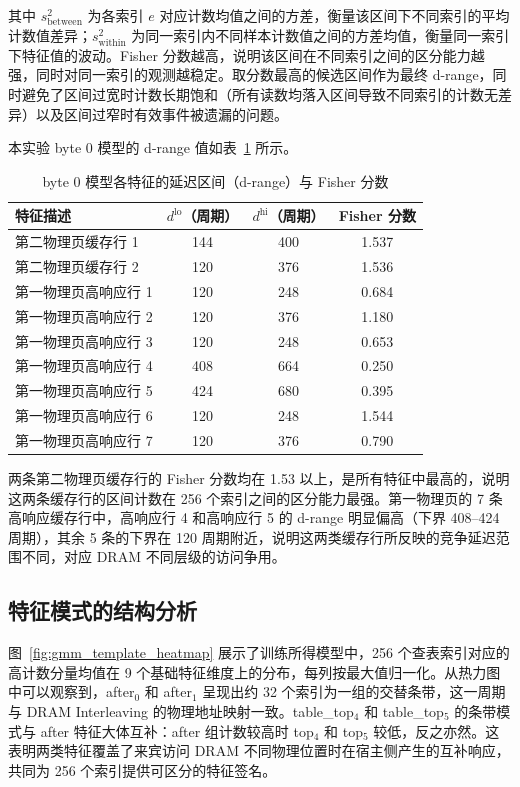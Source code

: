 其中 $s_{\mathrm{between}}^2$ 为各索引 $e$ 对应计数均值之间的方差，衡量该区间下不同索引的平均计数值差异；$s_{\mathrm{within}}^2$ 为同一索引内不同样本计数值之间的方差均值，衡量同一索引下特征值的波动。Fisher 分数越高，说明该区间在不同索引之间的区分能力越强，同时对同一索引的观测越稳定。取分数最高的候选区间作为最终 d-range，同时避免了区间过宽时计数长期饱和（所有读数均落入区间导致不同索引的计数无差异）以及区间过窄时有效事件被遗漏的问题。

本实验 byte 0 模型的 d-range 值如表~\ref{tab:drange_byte0} 所示。

\begin{table}[htbp]
  \centering
  \caption{byte 0 模型各特征的延迟区间（d-range）与 Fisher 分数}
  \label{tab:drange_byte0}
  \begin{tabular}{lccc}
    \toprule
    特征描述 & $d^{\mathrm{lo}}$（周期） & $d^{\mathrm{hi}}$（周期） & Fisher 分数 \\
    \midrule
    第二物理页缓存行 1  & 144 & 400 & 1.537 \\
    第二物理页缓存行 2  & 120 & 376 & 1.536 \\
    第一物理页高响应行 1 & 120 & 248 & 0.684 \\
    第一物理页高响应行 2 & 120 & 376 & 1.180 \\
    第一物理页高响应行 3 & 120 & 248 & 0.653 \\
    第一物理页高响应行 4 & 408 & 664 & 0.250 \\
    第一物理页高响应行 5 & 424 & 680 & 0.395 \\
    第一物理页高响应行 6 & 120 & 248 & 1.544 \\
    第一物理页高响应行 7 & 120 & 376 & 0.790 \\
    \bottomrule
  \end{tabular}
\end{table}

两条第二物理页缓存行的 Fisher 分数均在 1.53 以上，是所有特征中最高的，说明这两条缓存行的区间计数在 256 个索引之间的区分能力最强。第一物理页的 7 条高响应缓存行中，高响应行 4 和高响应行 5 的 d-range 明显偏高（下界 408--424 周期），其余 5 条的下界在 120 周期附近，说明这两类缓存行所反映的竞争延迟范围不同，对应 DRAM 不同层级的访问争用。

\subsection{特征模式的结构分析}

图~\ref{fig:gmm_template_heatmap} 展示了训练所得模型中，256 个查表索引对应的高计数分量均值在 9 个基础特征维度上的分布，每列按最大值归一化。从热力图中可以观察到，after$_0$ 和 after$_1$ 呈现出约 32 个索引为一组的交替条带，这一周期与 DRAM Interleaving 的物理地址映射一致。table\_top$_4$ 和 table\_top$_5$ 的条带模式与 after 特征大体互补：after 组计数较高时 top$_4$ 和 top$_5$ 较低，反之亦然。这表明两类特征覆盖了来宾访问 DRAM 不同物理位置时在宿主侧产生的互补响应，共同为 256 个索引提供可区分的特征签名。

